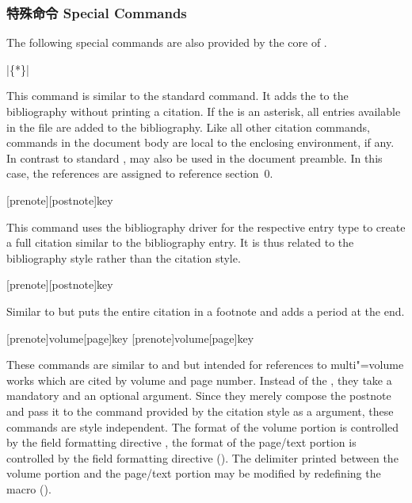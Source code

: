 \subsubsection{特殊命令 Special Commands}
\label{use:cit:spc}

The following special commands are also provided by the core of \biblatex.

\begin{ltxsyntax}

|\{*\}|

This command is similar to the standard \latex {} command. It adds the  to the bibliography without printing a citation. If the  is an asterisk, all entries available in the  file are added to the bibliography. Like all other citation commands,  commands in the document body are local to the enclosing  environment, if any. In contrast to standard \latex,  may also be used in the document preamble. In this case, the references are assigned to reference section~0.

[prenote][postnote]{key}

This command uses the bibliography driver for the respective entry type to create a full citation similar to the bibliography entry. It is thus related to the bibliography style rather than the citation style.

[prenote][postnote]{key}

Similar to  but puts the entire citation in a footnote and adds a period at the end.

[prenote]{volume}[page]{key}
[prenote]{volume}[page]{key}

These commands are similar to  and  but intended for references to multi"=volume works which are cited by volume and page number. Instead of the , they take a mandatory  and an optional  argument. Since they merely compose the postnote and pass it to the  command provided by the citation style as a  argument, these commands are style independent. The format of the volume portion is controlled by the field formatting directive , the format of the page/text portion is controlled by the field formatting directive  (). The delimiter printed between the volume portion and the page/text portion may be modified by redefining the macro  ().


\end{ltxsyntax}
